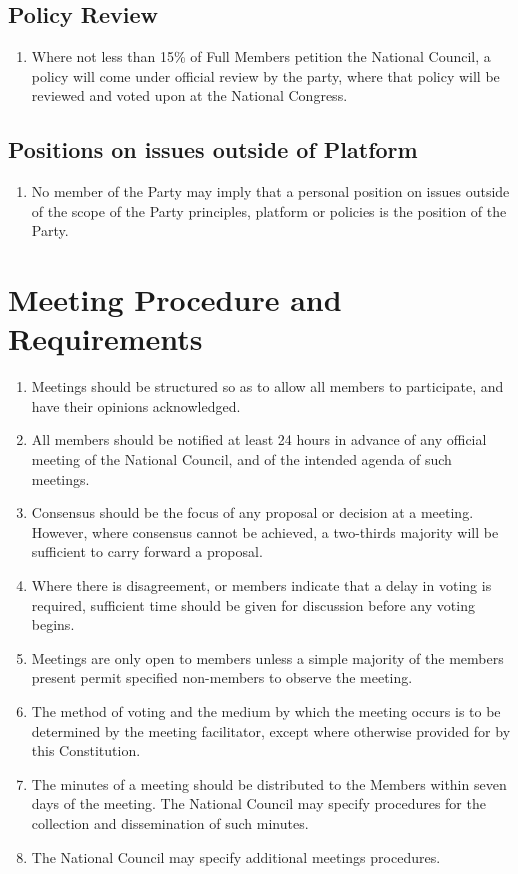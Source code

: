\documentclass[a4paper,titlepage,8.5pt]{article}
\begin{document}
\subsection{Policy Review}

\begin{enumerate}
\item Where not less than 15\% of Full Members petition the National Council, a policy will come under official review by the party, where that policy will be reviewed and voted upon at the National Congress.
\end{enumerate}

\subsection{Positions on issues outside of Platform}

\begin{enumerate}
\item No member of the Party may imply that a personal position on issues outside of the scope of the Party principles, platform or policies is the position of the Party.
\end{enumerate}

\section{Meeting Procedure and Requirements}

\begin{enumerate}
\item Meetings should be structured so as to allow all members to participate, and have their opinions acknowledged.
\item All members should be notified at least 24 hours in advance of any official meeting of the National Council, and of the intended agenda of such meetings.
\item Consensus should be the focus of any proposal or decision at a meeting. However, where consensus cannot be achieved, a two-thirds majority will be sufficient to carry forward a proposal.
\item Where there is disagreement, or members indicate that a delay in voting is required, sufficient time should be given for discussion before any voting begins.
\item Meetings are only open to members unless a simple majority of the members present permit specified non-members to observe the meeting.
\item The method of voting and the medium by which the meeting occurs is to be determined by the meeting facilitator, except where otherwise provided for by this Constitution.
\item The minutes of a meeting should be distributed to the Members within seven days of the meeting. The National Council may specify procedures for the collection and dissemination of such minutes.
\item The National Council may specify additional meetings procedures.
\end{enumerate}
\end{document}
